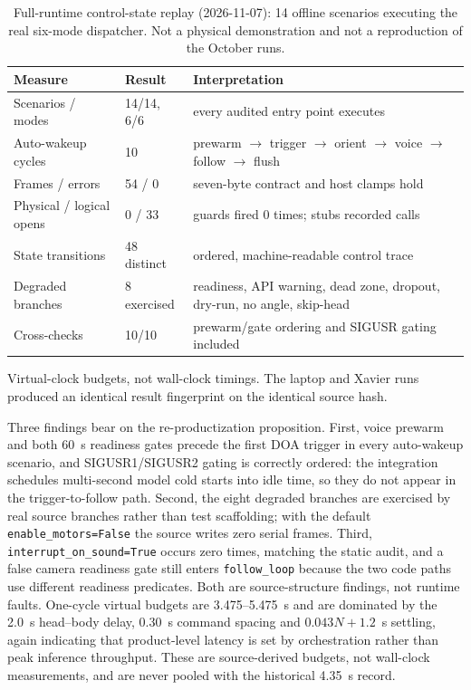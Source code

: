 \documentclass[conference]{IEEEtran}
\newcommand{\code}[1]{\texttt{#1}}
\begin{document}
\begin{table}[t]
\centering
\caption{Full-runtime control-state replay (2026-11-07): 14 offline scenarios executing the real six-mode dispatcher. Not a physical demonstration and not a reproduction of the October runs.}
\label{tab:fullreplay}
\footnotesize
\begin{tabularx}{\columnwidth}{@{}p{31mm}p{23mm}Y@{}}
\toprule
Measure & Result & Interpretation\\
\midrule
Scenarios / modes & 14/14, 6/6 & every audited entry point executes\\
Auto-wakeup cycles & 10 & prewarm $\to$ trigger $\to$ orient $\to$ voice $\to$ follow $\to$ flush\\
Frames / errors & 54 / 0 & seven-byte contract and host clamps hold\\
Physical / logical opens & 0 / 33 & guards fired 0 times; stubs recorded calls\\
State transitions & 48 distinct & ordered, machine-readable control trace\\
Degraded branches & 8 exercised & readiness, API warning, dead zone, dropout, dry-run, no angle, skip-head\\
Cross-checks & 10/10 & prewarm/gate ordering and SIGUSR gating included\\
\bottomrule
\end{tabularx}
\vspace{2pt}
\begin{flushleft}
\footnotesize Virtual-clock budgets, not wall-clock timings. The laptop and Xavier runs produced an identical result fingerprint on the identical source hash.
\end{flushleft}
\end{table}

Three findings bear on the re-productization proposition. First, voice prewarm and both 60~s readiness gates precede the first DOA trigger in every auto-wakeup scenario, and SIGUSR1/SIGUSR2 gating is correctly ordered: the integration schedules multi-second model cold starts into idle time, so they do not appear in the trigger-to-follow path. Second, the eight degraded branches are exercised by real source branches rather than test scaffolding; with the default \code{enable\_motors=False} the source writes zero serial frames. Third, \code{interrupt\_on\_sound=True} occurs zero times, matching the static audit, and a false camera readiness gate still enters \code{follow\_loop} because the two code paths use different readiness predicates. Both are source-structure findings, not runtime faults. One-cycle virtual budgets are 3.475--5.475~s and are dominated by the 2.0~s head--body delay, 0.30~s command spacing and $0.043N+1.2$~s settling, again indicating that product-level latency is set by orchestration rather than peak inference throughput. These are source-derived budgets, not wall-clock measurements, and are never pooled with the historical 4.35~s record.
\end{document}
